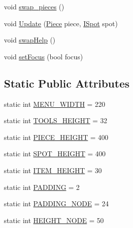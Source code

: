 \begin{DoxyCompactItemize}
void \hyperlink{classgearit_1_1src_1_1_g_u_i_1_1_menu_robot_editor_ad72993bb65e8a055bab043f997a22ff6}{swap\+\_\+pieces} ()
\item 
void \hyperlink{classgearit_1_1src_1_1_g_u_i_1_1_menu_robot_editor_a64d32c6114ccfe40ccfa53933480fd2a}{Update} (\hyperlink{classgearit_1_1src_1_1robot_1_1_piece}{Piece} piece, \hyperlink{interfacegearit_1_1src_1_1robot_1_1_i_spot}{I\+Spot} spot)
\item 
void \hyperlink{classgearit_1_1src_1_1_g_u_i_1_1_menu_robot_editor_ae3f5d7559311c781924fe9ec1109dd83}{swap\+Help} ()
\item 
void \hyperlink{classgearit_1_1src_1_1_g_u_i_1_1_menu_robot_editor_af52d0167dd80969841124fac05d6a5d1}{set\+Focus} (bool focus)
\end{DoxyCompactItemize}
\subsection*{Static Public Attributes}
\begin{DoxyCompactItemize}
\item 
static int \hyperlink{classgearit_1_1src_1_1_g_u_i_1_1_menu_robot_editor_ad92a34daa4b78753de76bc122e72b1e3}{M\+E\+N\+U\+\_\+\+W\+I\+D\+T\+H} = 220
\item 
static int \hyperlink{classgearit_1_1src_1_1_g_u_i_1_1_menu_robot_editor_a54d5dd71266d711ac0b102fd66e37223}{T\+O\+O\+L\+S\+\_\+\+H\+E\+I\+G\+H\+T} = 32
\item 
static int \hyperlink{classgearit_1_1src_1_1_g_u_i_1_1_menu_robot_editor_a436ae2865849e12ef79e425425651185}{P\+I\+E\+C\+E\+\_\+\+H\+E\+I\+G\+H\+T} = 400
\item 
static int \hyperlink{classgearit_1_1src_1_1_g_u_i_1_1_menu_robot_editor_a0252a27d45d243d7fdef3839de3bebc7}{S\+P\+O\+T\+\_\+\+H\+E\+I\+G\+H\+T} = 400
\item 
static int \hyperlink{classgearit_1_1src_1_1_g_u_i_1_1_menu_robot_editor_acecb4d36a8863da6b9656fb6e5fcaac2}{I\+T\+E\+M\+\_\+\+H\+E\+I\+G\+H\+T} = 30
\item 
static int \hyperlink{classgearit_1_1src_1_1_g_u_i_1_1_menu_robot_editor_aa474b7202cc9c17a799275ed0b131818}{P\+A\+D\+D\+I\+N\+G} = 2
\item 
static int \hyperlink{classgearit_1_1src_1_1_g_u_i_1_1_menu_robot_editor_a5bd8bfded0c0c7d2cf0a80351f86f25b}{P\+A\+D\+D\+I\+N\+G\+\_\+\+N\+O\+D\+E} = 24
\item 
static int \hyperlink{classgearit_1_1src_1_1_g_u_i_1_1_menu_robot_editor_a8fae674b7aa130f67190dc5bc550e353}{H\+E\+I\+G\+H\+T\+\_\+\+N\+O\+D\+E} = 50
\end{DoxyCompactItemize}
